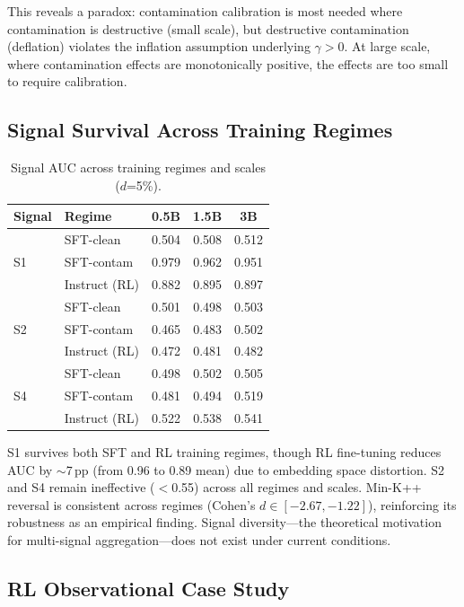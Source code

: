 \documentclass[11pt,a4paper]{article}
\begin{document}
This reveals a paradox: contamination calibration is most needed where contamination is destructive (small scale), but destructive contamination (deflation) violates the inflation assumption underlying $\gamma > 0$.
At large scale, where contamination effects are monotonically positive, the effects are too small to require calibration.

\subsection{Signal Survival Across Training Regimes}
\label{sec:survival}

\begin{table}[h]
\centering
\caption{Signal AUC across training regimes and scales ($d$=5\%).}
\label{tab:survival}
\small
\begin{tabular}{llccc}
\toprule
Signal & Regime & 0.5B & 1.5B & 3B \\
\midrule
\multirow{3}{*}{S1} & SFT-clean & 0.504 & 0.508 & 0.512 \\
 & SFT-contam & 0.979 & 0.962 & 0.951 \\
 & Instruct (RL) & 0.882 & 0.895 & 0.897 \\
\midrule
\multirow{3}{*}{S2} & SFT-clean & 0.501 & 0.498 & 0.503 \\
 & SFT-contam & 0.465 & 0.483 & 0.502 \\
 & Instruct (RL) & 0.472 & 0.481 & 0.482 \\
\midrule
\multirow{3}{*}{S4} & SFT-clean & 0.498 & 0.502 & 0.505 \\
 & SFT-contam & 0.481 & 0.494 & 0.519 \\
 & Instruct (RL) & 0.522 & 0.538 & 0.541 \\
\bottomrule
\end{tabular}
\end{table}

S1 survives both SFT and RL training regimes, though RL fine-tuning reduces AUC by $\sim$7\,pp (from 0.96 to 0.89 mean) due to embedding space distortion.
S2 and S4 remain ineffective ($<$0.55) across all regimes and scales.
Min-K++ reversal is consistent across regimes (Cohen's $d \in [-2.67, -1.22]$), reinforcing its robustness as an empirical finding.
Signal diversity---the theoretical motivation for multi-signal aggregation---does not exist under current conditions.

\subsection{RL Observational Case Study}
\label{sec:rl}
\end{document}

